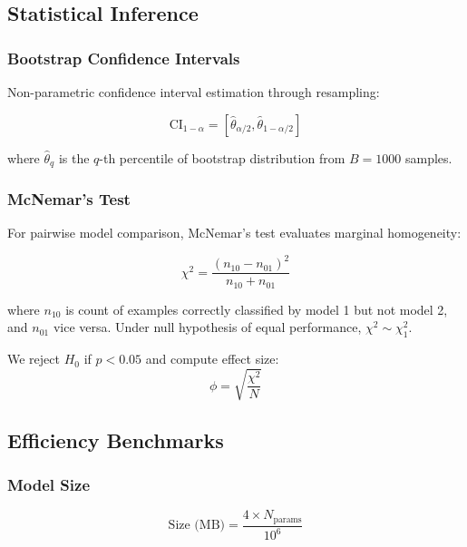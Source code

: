 \subsection{Statistical Inference}

\subsubsection{Bootstrap Confidence Intervals}

Non-parametric confidence interval estimation through resampling:

\begin{equation}
\text{CI}_{1-\alpha} = [\hat{\theta}_{\alpha/2}, \hat{\theta}_{1-\alpha/2}]
\end{equation}

where $\hat{\theta}_q$ is the $q$-th percentile of bootstrap distribution from $B=1000$ samples.

\subsubsection{McNemar's Test}

For pairwise model comparison, McNemar's test evaluates marginal homogeneity:

\begin{equation}
\chi^2 = \frac{(n_{10} - n_{01})^2}{n_{10} + n_{01}}
\end{equation}

where $n_{10}$ is count of examples correctly classified by model 1 but not model 2, and $n_{01}$ vice versa. Under null hypothesis of equal performance, $\chi^2 \sim \chi^2_1$.

We reject $H_0$ if $p < 0.05$ and compute effect size:
\begin{equation}
\phi = \sqrt{\frac{\chi^2}{N}}
\end{equation}

\subsection{Efficiency Benchmarks}

\subsubsection{Model Size}

\begin{equation}
\text{Size (MB)} = \frac{4 \times N_{\text{params}}}{10^6}
\end{equation}

